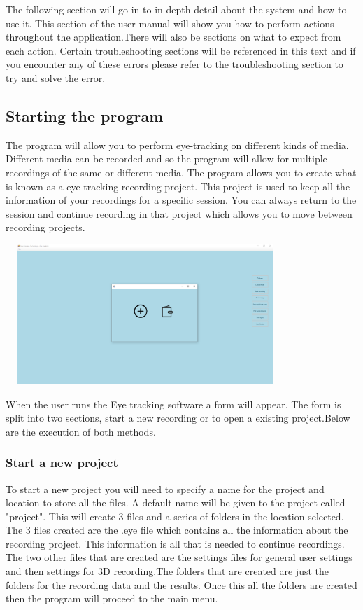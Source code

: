 The following section will go in to in depth detail about the system and how to use it. This section of the user manual will show you how to perform actions throughout the application.There will also be sections on what to expect from each action. Certain troubleshooting sections will be referenced in this text and if you encounter any of these errors please refer to the troubleshooting section to try and solve the error.

\subsection{Starting the program}
The program will allow you to perform eye-tracking on different kinds of media. Different media can be recorded and so the program will allow for multiple recordings of the same or different media. The program allows you to create what is known as a eye-tracking recording project. This project is used to keep all the information of your recordings for a specific session. You can always return to the session and continue recording in that project which allows you to move between recording projects.\newline

\includegraphics[width=400px,height=200px]{./Images/StartupPage.PNG}

When the user runs the Eye tracking software a form will appear. The form is split into two sections, start a new recording or to open a existing project.Below are the execution of both methods.

\subsubsection{Start a new project} 
To start a new project you will need to specify a name for the project and location to store all the files. A default name will be given to the project called "project". This will create 3 files and a series of folders in the location selected. The 3 files created are the .eye file which contains all the information about the recording project. This information is all that is needed to continue recordings. The two other files that are created are the settings files for general user settings and then settings for 3D recording.The folders that are created are just the folders for the recording data and the results. Once this all the folders are created then the program will proceed to the main menu.


